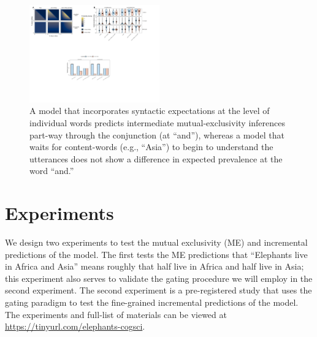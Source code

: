 \documentclass[10pt,letterpaper]{article}
\providecommand{\tightlist}{%
  \setlength{\itemsep}{0pt}\setlength{\parskip}{0pt}}
\newcommand{\denote}[1]{\mbox{ $[\![ #1 ]\!]$}}
\begin{document}
\begin{figure}[t]
  \centering
    \includegraphics[width=0.5\textwidth]{incremental}
  \caption{A model that incorporates syntactic expectations at the level of individual words predicts intermediate mutual-exclusivity inferences part-way through the conjunction (at ``and''), whereas a model that waits for content-words (e.g., ``Asia'') to begin to understand the utterances does not show a difference in expected prevalence at the word ``and.''
  }
  \label{fig:incremental}
\end{figure}


%


\section{Experiments}

We design two experiments to test the mutual exclusivity (ME) and incremental predictions of the model. 
The first tests the ME predictions that ``Elephants live in Africa and Asia'' means roughly that half live in Africa and half live in Asia; this experiment also serves to validate the gating procedure we will employ in the second experiment. 
The second experiment is a pre-registered study that uses the gating paradigm to test the fine-grained incremental predictions of the model.
The experiments and full-list of materials can be viewed at \url{https://tinyurl.com/elephants-cogsci}.
\end{document}
